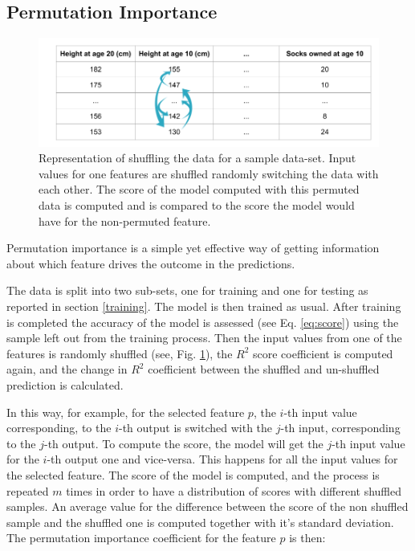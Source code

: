 \subsection{Permutation Importance}\label{permutation}

\begin{figure}[!tp]
	\centering		  
	\includegraphics[width=1.\textwidth]{figures/permutation.png}
	\caption{Representation of shuffling the data for a sample data-set. Input values for one features are shuffled randomly switching the data with each other. The score of the model computed with this permuted data is computed and is compared  to the score the model would have for the non-permuted feature.}
	\label{fig:permutation}
\end{figure}

Permutation importance is a simple yet effective way of getting information about which feature drives the outcome in the predictions. 

The data is split into two sub-sets, one for training and one for testing as reported in section \ref{training}. The model is then trained as usual. After training is completed the accuracy of the model is assessed (see Eq. \ref{eq:score}) using the sample left out from the training process. Then the input values from one of the features is randomly shuffled (see, Fig. \ref{fig:permutation}), the $R^2$ score coefficient is computed again, and the change in $R^2$ coefficient between the shuffled and un-shuffled prediction is calculated. 

In this way, for example, for the selected feature $p$, the $i$-th input value corresponding, to the $i$-th output is switched with the $j$-th input, corresponding to the $j$-th output. To compute the score, the model will get the $j$-th input value for the $i$-th output one and vice-versa. This happens for all the input values for the selected feature. The score of the model is computed, and the process is repeated $m$ times in order to have a distribution of scores with different shuffled samples. An average value for the difference between the score of the non shuffled sample and the shuffled one is computed together with it's standard deviation.
The permutation importance coefficient for the feature $p$ is then:

